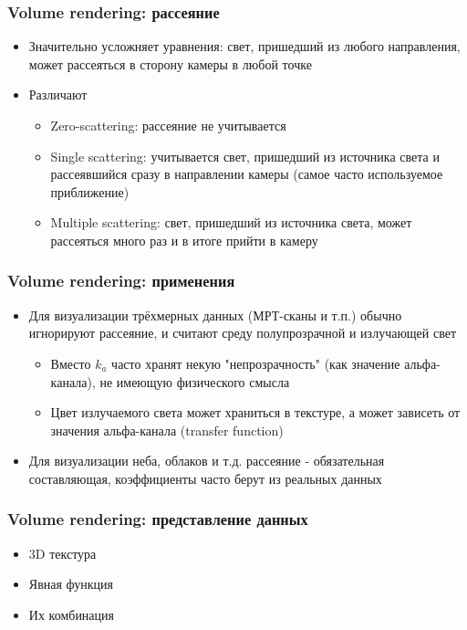 \documentclass{beamer}
\begin{document}
\begin{frame}[fragile]
\frametitle{Volume rendering: рассеяние}
\begin{itemize}
\item Значительно усложняет уравнения: свет, пришедший из любого направления, может рассеяться в сторону камеры в любой точке
\pause
\item Различают
\begin{itemize}
\item Zero-scattering: рассеяние не учитывается
\item Single scattering: учитывается свет, пришедший из источника света и рассеявшийся сразу в направлении камеры (самое часто используемое приближение)
\item Multiple scattering: свет, пришедший из источника света, может рассеяться много раз и в итоге прийти в камеру
\end{itemize}
\end{itemize}
\end{frame}

\begin{frame}[fragile]
\frametitle{Volume rendering: применения}
\begin{itemize}
\item Для визуализации трёхмерных данных (МРТ-сканы и т.п.) обычно игнорируют рассеяние, и считают среду полупрозрачной и излучающей свет
\pause
\begin{itemize}
\item Вместо \begin{math}k_a\end{math} часто хранят некую "непрозрачность" (как значение альфа-канала), не имеющую физического смысла
\pause
\item Цвет излучаемого света может храниться в текстуре, а может зависеть от значения альфа-канала (transfer function)
\end{itemize}
\pause
\item Для визуализации неба, облаков и т.д. рассеяние - обязательная составляющая, коэффициенты часто берут из реальных данных
\end{itemize}
\end{frame}

\begin{frame}[fragile]
\frametitle{Volume rendering: представление данных}
\begin{itemize}
\item 3D текстура
\pause
\item Явная функция
\pause
\item Их комбинация
\end{itemize}
\end{frame}
\end{document}
